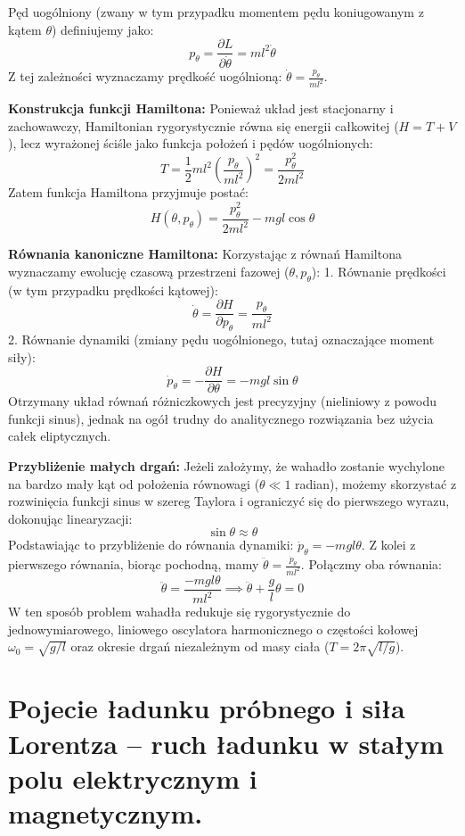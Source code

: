 \documentclass[11pt, a4paper]{article}
\begin{document}
Pęd uogólniony (zwany w tym przypadku momentem pędu koniugowanym z kątem $\theta$) definiujemy jako:
\[
p_\theta = \frac{\partial L}{\partial \dot{\theta}} = ml^2\dot{\theta}
\]
Z tej zależności wyznaczamy prędkość uogólnioną: $\dot{\theta} = \frac{p_\theta}{ml^2}$.

\textbf{Konstrukcja funkcji Hamiltona:}
Ponieważ układ jest stacjonarny i zachowawczy, Hamiltonian rygorystycznie równa się energii całkowitej ($H = T + V$), lecz wyrażonej ściśle jako funkcja położeń i pędów uogólnionych:
\[
T = \frac{1}{2}ml^2 \left(\frac{p_\theta}{ml^2}\right)^2 = \frac{p_\theta^2}{2ml^2}
\]
Zatem funkcja Hamiltona przyjmuje postać:
\[
H(\theta, p_\theta) = \frac{p_\theta^2}{2ml^2} - mgl\cos\theta
\]

\textbf{Równania kanoniczne Hamiltona:}
Korzystając z równań Hamiltona wyznaczamy ewolucję czasową przestrzeni fazowej ($\theta, p_\theta$):
1. Równanie prędkości (w tym przypadku prędkości kątowej):
\[
\dot{\theta} = \frac{\partial H}{\partial p_\theta} = \frac{p_\theta}{ml^2}
\]
2. Równanie dynamiki (zmiany pędu uogólnionego, tutaj oznaczające moment siły):
\[
\dot{p}_\theta = -\frac{\partial H}{\partial \theta} = -mgl\sin\theta
\]
Otrzymany układ równań różniczkowych jest precyzyjny (nieliniowy z powodu funkcji sinus), jednak na ogół trudny do analitycznego rozwiązania bez użycia całek eliptycznych.

\textbf{Przybliżenie małych drgań:}
Jeżeli założymy, że wahadło zostanie wychylone na bardzo mały kąt od położenia równowagi ($\theta \ll 1$ radian), możemy skorzystać z rozwinięcia funkcji sinus w szereg Taylora i ograniczyć się do pierwszego wyrazu, dokonując linearyzacji:
\[
\sin\theta \approx \theta
\]
Podstawiając to przybliżenie do równania dynamiki: $\dot{p}_\theta = -mgl\theta$. Z kolei z pierwszego równania, biorąc pochodną, mamy $\ddot{\theta} = \frac{\dot{p}_\theta}{ml^2}$. Połączmy oba równania:
\[
\ddot{\theta} = \frac{-mgl\theta}{ml^2} \implies \ddot{\theta} + \frac{g}{l}\theta = 0
\]
W ten sposób problem wahadła redukuje się rygorystycznie do jednowymiarowego, liniowego oscylatora harmonicznego o częstości kołowej $\omega_0 = \sqrt{g/l}$ oraz okresie drgań niezależnym od masy ciała ($T = 2\pi\sqrt{l/g}$).

\section{Pojecie ładunku próbnego i siła Lorentza – ruch ładunku w stałym polu elektrycznym i magnetycznym.}
\end{document}
